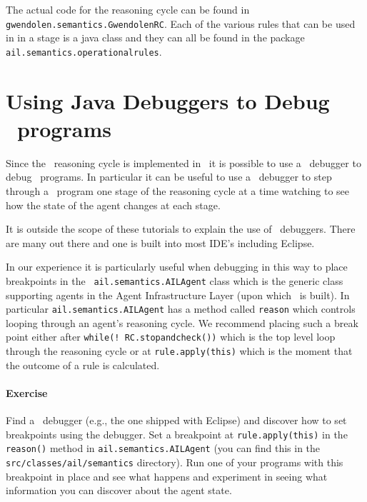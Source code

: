 The actual code for the reasoning cycle can be found in \texttt{gwendolen.semantics.GwendolenRC}.  Each of the various rules that can be used in in a stage is a java class and they can all be found in the package \texttt{ail.semantics.operationalrules}.

\section{Using Java Debuggers to Debug \gwendolen\ programs}

Since the \gwendolen\ reasoning cycle is implemented in \java\ it is possible to use a \java\ debugger to debug \gwendolen\ programs.  In particular it can be useful to use a \java\ debugger to step through a \gwendolen\ program one stage of the reasoning cycle at a time watching to see how the state of the agent changes at each stage.

It is outside the scope of these tutorials to explain the use of \java\ debuggers.  There are many out there and one is built into most IDE's including Eclipse.

In our experience it is particularly useful when debugging in this way to place breakpoints in the \java\ \texttt{ail.semantics.AILAgent} class which is the generic class supporting agents in the Agent Infrastructure Layer (upon which \gwendolen\ is built).  In particular \texttt{ail.semantics.AILAgent} has a method called \texttt{reason} which controls looping through an agent's reasoning cycle.  We recommend placing such a break point either after \texttt{while(! RC.stopandcheck())} which is the top level loop through the reasoning cycle or at \texttt{rule.apply(this)} which is the moment that the outcome of a rule is calculated.

\paragraph{Exercise} Find a \java\ debugger (e.g., the one shipped with Eclipse) and discover how to set breakpoints using the debugger.  Set a breakpoint at \texttt{rule.apply(this)} in the \texttt{reason()} method in \texttt{ail.semantics.AILAgent} (you can find this in the \texttt{src/classes/ail/semantics} directory).  Run one of your programs with this breakpoint in place and see what happens and experiment in seeing what information you can discover about the agent state.

